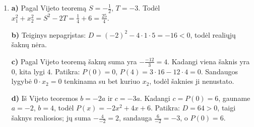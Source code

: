 \documentclass[12pt,a4paper]{article}
\begin{document}
\begin{enumerate}
Taigi $P(x)=-2x^2+8x-8=-2(x-2)^2$. Kadangi kvadratas neneigiamas, maksimumas yra $0$ kai $x=2$; taip pat $P(0)=-8$. Visos sąlygos tenkinamos.
\item \textbf{a)} Pagal Vijeto teoremą $S=-\frac12$, $T=-3$. Todėl $x_1^2+x_2^2=S^2-2T=\frac14+6=\frac{25}{4}$.

\textbf{b)} Teiginys nepagrįstas: $D=(-2)^2-4\cdot1\cdot5=-16<0$, todėl realiųjų šaknų nėra.

\textbf{c)} Pagal Vijeto teoremą šaknų suma yra $-\frac{-12}{3}=4$. Kadangi viena šaknis yra $0$, kita lygi $4$. Patikra: $P(0)=0$, $P(4)=3\cdot16-12\cdot4=0$. Sandaugos lygybė $0\cdot x_2=0$ tenkinama su bet kuriuo $x_2$, todėl šaknies ji nenustato.

\textbf{d)} Iš Vijeto teoremos $b=-2a$ ir $c=-3a$. Kadangi $c=P(0)=6$, gauname $a=-2$, $b=4$, todėl $P(x)=-2x^2+4x+6$. Patikra: $D=64>0$, taigi šaknys realiosios; jų suma $-\frac{4}{-2}=2$, sandauga $\frac6{-2}=-3$, o $P(0)=6$.
\end{enumerate}
\end{document}
